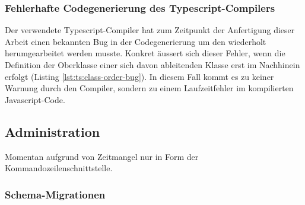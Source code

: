 \subsubsection{Fehlerhafte Codegenerierung des Typescript-Compilers}

Der verwendete Typescript-Compiler hat zum Zeitpunkt der Anfertigung dieser Arbeit einen bekannten Bug in der Codegenerierung \cite{ts-compiler-class-order-bug} um den wiederholt herumgearbeitet werden musste. Konkret äussert sich dieser Fehler, wenn die Definition der Oberklasse einer sich davon ableitenden Klasse erst im Nachhinein erfolgt (Listing \ref{lst:ts:class-order-bug}). In diesem Fall kommt es zu keiner Warnung durch den Compiler, sondern zu einem Laufzeitfehler im kompilierten Javascript-Code.



\subsection{Administration}
\label{sec:implementation-administration}

Momentan aufgrund von Zeitmangel nur in Form der Kommandozeilenschnittstelle.

\subsubsection{Schema-Migrationen}
\label{sec:implementation-migration}

